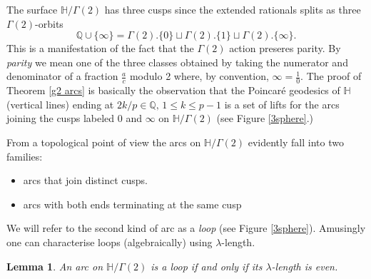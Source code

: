 \documentclass[12pt,a4paper]{amsart}
\newtheorem{lem}[thm]{Lemma}
\def\HH{\mathbb{H}}
\def\g2{\Gamma(2)}
\def\xx{\HH/\g2}
\def\qqq{\mathbb{Q} \cup \{\infty\}}
\begin{document}
\noindent
The surface  $\xx$ has three cusps 
since the extended rationals  splits as three $\g2$-orbits
$$\qqq = \g2.\{0\} \sqcup  \g2. \{1\} \sqcup \g2. \{\infty\}.$$
This is a manifestation of the fact that the $\g2$ action 
preseres parity.
By \textit{parity} we mean one
of the three classes obtained by taking the 
numerator and denominator  of  a fraction $\frac{a}{c}$ modulo 2
where, by convention, $\infty = \frac{1}{0}$.
The proof of Theorem \ref{g2 arcs} is basically the observation that the Poincaré geodesics
of $\mathbb{H}$ (vertical lines) ending at $2k / p \in \mathbb{Q},\, 1\leq k \leq
p-1$ is a set of lifts for the arcs joining the cusps labeled $0$ and
$\infty$ on $\xx$ (see Figure \ref{3sphere}.)



	




From a topological point of view the arcs on $\xx$ evidently fall into two families:
\begin{itemize}
	\item arcs that join distinct cusps. 
	\item arcs with both ends terminating at the same cusp
\end{itemize}
We will refer to the second kind of arc as a \textit{loop}
(see Figure \ref{3sphere}).
Amusingly one can characterise loops (algebraically) using $\lambda$-length.
\begin{lem}\label{length parity}
	An arc on $\xx$ is a loop if and only if its
	$\lambda$-length is even.
\end{lem}
\end{document}
